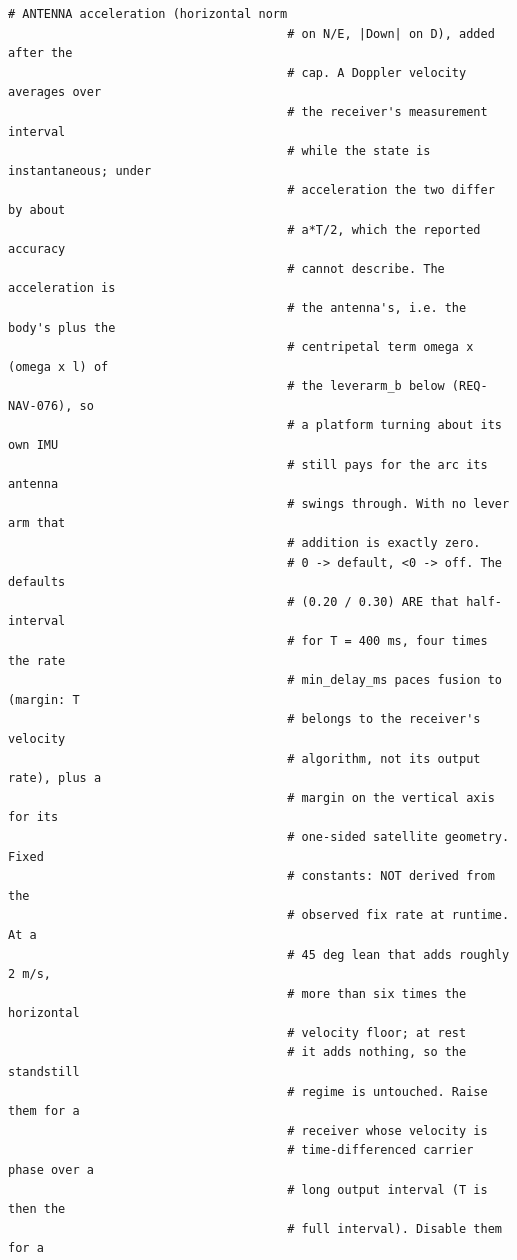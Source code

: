 \documentclass[11pt,a4paper]{article}
\begin{document}
\begin{lstlisting}[style=cfg]
                                       # ANTENNA acceleration (horizontal norm
                                       # on N/E, |Down| on D), added after the
                                       # cap. A Doppler velocity averages over
                                       # the receiver's measurement interval
                                       # while the state is instantaneous; under
                                       # acceleration the two differ by about
                                       # a*T/2, which the reported accuracy
                                       # cannot describe. The acceleration is
                                       # the antenna's, i.e. the body's plus the
                                       # centripetal term omega x (omega x l) of
                                       # the leverarm_b below (REQ-NAV-076), so
                                       # a platform turning about its own IMU
                                       # still pays for the arc its antenna
                                       # swings through. With no lever arm that
                                       # addition is exactly zero.
                                       # 0 -> default, <0 -> off. The defaults
                                       # (0.20 / 0.30) ARE that half-interval
                                       # for T = 400 ms, four times the rate
                                       # min_delay_ms paces fusion to (margin: T
                                       # belongs to the receiver's velocity
                                       # algorithm, not its output rate), plus a
                                       # margin on the vertical axis for its
                                       # one-sided satellite geometry. Fixed
                                       # constants: NOT derived from the
                                       # observed fix rate at runtime. At a
                                       # 45 deg lean that adds roughly 2 m/s,
                                       # more than six times the horizontal
                                       # velocity floor; at rest
                                       # it adds nothing, so the standstill
                                       # regime is untouched. Raise them for a
                                       # receiver whose velocity is
                                       # time-differenced carrier phase over a
                                       # long output interval (T is then the
                                       # full interval). Disable them for a

\end{lstlisting}
\end{document}
